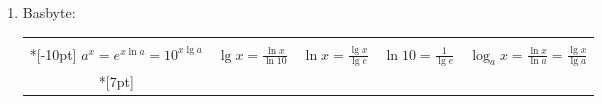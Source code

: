 \documentclass{article}
\begin{document}
\begin{enumerate}
  \item Basbyte: \hfill
     \begin{tabular}[m]{|c|c|c|c|c|}
       \hline &&&&\\*[-10pt]
       $a^x = e^{x\ln a}=10^{x\lg a}$ &
        $\lg x =\frac{\ln x}{\ln10}$ &
        $\ln x=\frac{\lg x}{\lg e}$ &
        $\ln 10 = \frac{1}{\lg e}$ &
        $\log_a x =\frac{\ln x}{\ln a} =\frac{\lg x}{\lg a}$\\*[7pt]
       \hline
     \end{tabular}


\end{enumerate}
\end{document}
